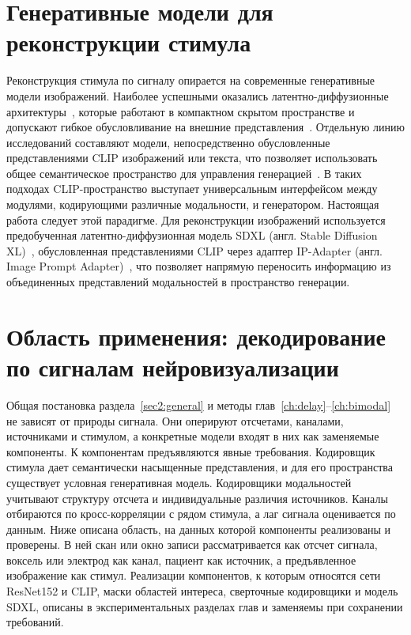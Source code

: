 \section{Генеративные модели для реконструкции стимула}\label{sec1:generative}

Реконструкция стимула по сигналу опирается на современные генеративные модели изображений. Наиболее успешными оказались латентно-диффузионные архитектуры~\cite{rombach2022high}, которые работают в компактном скрытом пространстве и допускают гибкое обусловливание на внешние представления~\cite{esser2021tamingtransformershighresolutionimage, hatamizadeh2024diffitdiffusionvisiontransformers}. Отдельную линию исследований составляют модели, непосредственно обусловленные представлениями CLIP изображений или текста, что позволяет использовать общее семантическое пространство для управления генерацией~\cite{radford2021learning, crowson2022vqganclipopendomainimage}. В таких подходах CLIP-пространство выступает универсальным интерфейсом между модулями, кодирующими различные модальности, и генератором. Настоящая работа следует этой парадигме. Для реконструкции изображений используется предобученная латентно-диффузионная модель SDXL (англ. Stable Diffusion XL)~\cite{podell2023sdxlimprovinglatentdiffusion}, обусловленная представлениями CLIP через адаптер IP-Adapter (англ. Image Prompt Adapter)~\cite{ye2023ipadaptertextcompatibleimage}, что позволяет напрямую переносить информацию из объединенных представлений модальностей в пространство генерации.

\section{Область применения: декодирование по сигналам нейровизуализации}\label{sec1:bci}

Общая постановка раздела~\ref{sec2:general} и методы глав~\ref{ch:delay}--\ref{ch:bimodal} не зависят от природы сигнала. Они оперируют отсчетами, каналами, источниками и стимулом, а конкретные модели входят в них как заменяемые компоненты. К компонентам предъявляются явные требования. Кодировщик стимула дает семантически насыщенные представления, и для его пространства существует условная генеративная модель. Кодировщики модальностей учитывают структуру отсчета и индивидуальные различия источников. Каналы отбираются по кросс-корреляции с рядом стимула, а лаг сигнала оценивается по данным. Ниже описана область, на данных которой компоненты реализованы и проверены. В ней скан или окно записи рассматривается как отсчет сигнала, воксель или электрод как канал, пациент как источник, а предъявленное изображение как стимул. Реализации компонентов, к которым относятся сети ResNet152 и CLIP, маски областей интереса, сверточные кодировщики и модель SDXL, описаны в экспериментальных разделах глав и заменяемы при сохранении требований.

